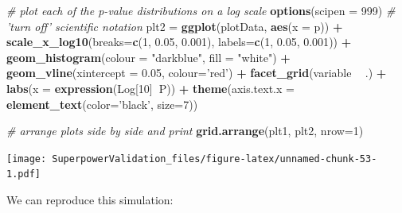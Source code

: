 \documentclass[]{book}
\newenvironment{Shaded}{\begin{snugshade}}{\end{snugshade}}
\newcommand{\CommentTok}[1]{\textcolor[rgb]{0.56,0.35,0.01}{\textit{#1}}}
\newcommand{\DataTypeTok}[1]{\textcolor[rgb]{0.13,0.29,0.53}{#1}}
\newcommand{\DecValTok}[1]{\textcolor[rgb]{0.00,0.00,0.81}{#1}}
\newcommand{\FloatTok}[1]{\textcolor[rgb]{0.00,0.00,0.81}{#1}}
\newcommand{\KeywordTok}[1]{\textcolor[rgb]{0.13,0.29,0.53}{\textbf{#1}}}
\newcommand{\NormalTok}[1]{#1}
\newcommand{\OperatorTok}[1]{\textcolor[rgb]{0.81,0.36,0.00}{\textbf{#1}}}
\newcommand{\StringTok}[1]{\textcolor[rgb]{0.31,0.60,0.02}{#1}}
\begin{document}
\begin{Shaded}
\begin{Highlighting}[]
\CommentTok{# plot each of the p-value distributions on a log scale}
\KeywordTok{options}\NormalTok{(}\DataTypeTok{scipen =} \DecValTok{999}\NormalTok{) }\CommentTok{# 'turn off' scientific notation}
\NormalTok{plt2 =}\StringTok{ }\KeywordTok{ggplot}\NormalTok{(plotData, }\KeywordTok{aes}\NormalTok{(}\DataTypeTok{x =}\NormalTok{ p)) }\OperatorTok{+}
\StringTok{    }\KeywordTok{scale_x_log10}\NormalTok{(}\DataTypeTok{breaks=}\KeywordTok{c}\NormalTok{(}\DecValTok{1}\NormalTok{, }\FloatTok{0.05}\NormalTok{, }\FloatTok{0.001}\NormalTok{), }
                  \DataTypeTok{labels=}\KeywordTok{c}\NormalTok{(}\DecValTok{1}\NormalTok{, }\FloatTok{0.05}\NormalTok{, }\FloatTok{0.001}\NormalTok{)) }\OperatorTok{+}
\StringTok{    }\KeywordTok{geom_histogram}\NormalTok{(}\DataTypeTok{colour =} \StringTok{"darkblue"}\NormalTok{, }\DataTypeTok{fill =} \StringTok{"white"}\NormalTok{) }\OperatorTok{+}
\StringTok{    }\KeywordTok{geom_vline}\NormalTok{(}\DataTypeTok{xintercept =} \FloatTok{0.05}\NormalTok{, }\DataTypeTok{colour=}\StringTok{'red'}\NormalTok{) }\OperatorTok{+}
\StringTok{    }\KeywordTok{facet_grid}\NormalTok{(variable }\OperatorTok{~}\StringTok{ }\NormalTok{.) }\OperatorTok{+}
\StringTok{    }\KeywordTok{labs}\NormalTok{(}\DataTypeTok{x =} \KeywordTok{expression}\NormalTok{(Log[}\DecValTok{10}\NormalTok{]}\OperatorTok{~}\NormalTok{P)) }\OperatorTok{+}
\StringTok{    }\KeywordTok{theme}\NormalTok{(}\DataTypeTok{axis.text.x =} \KeywordTok{element_text}\NormalTok{(}\DataTypeTok{color=}\StringTok{'black'}\NormalTok{, }\DataTypeTok{size=}\DecValTok{7}\NormalTok{))}
 
\CommentTok{# arrange plots side by side and print}
\KeywordTok{grid.arrange}\NormalTok{(plt1, plt2, }\DataTypeTok{nrow=}\DecValTok{1}\NormalTok{)}
\end{Highlighting}
\end{Shaded}

\texttt{[image: SuperpowerValidation\_files/figure-latex/unnamed-chunk-53-1.pdf]}

We can reproduce this simulation:
\end{document}
